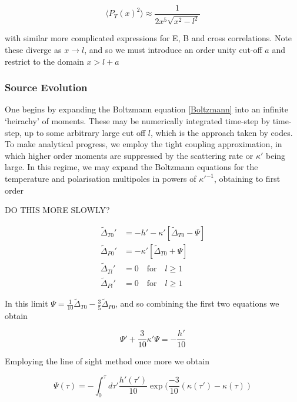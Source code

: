 \documentclass[a4paper,10pt]{article}
\begin{document}
\begin{equation}
\langle P_T(x)^2 \rangle \approx \frac{1}{2x^5\sqrt{x^2-l^2}}
\end{equation}

with similar more complicated expressions for E, B and cross correlations. Note these diverge as $x\rightarrow l$, and so we must introduce an order unity cut-off $a$ and restrict to the domain $x>l+a$





\subsubsection{Source Evolution}

One begins by expanding the Boltzmann equation \ref{Boltzmann} into an infinite `heirachy' of moments. These may be numerically integrated time-step by time-step, up to some arbitrary large cut off $l$, which is the approach taken by codes. To make analytical progress, we employ the tight coupling approximation, in which higher order moments are suppressed by the scattering rate or $\kappa'$ being large. In this regime, we may expand the Boltzmann equations for the temperature and polarisation multipoles in powers of $\kappa'^{-1}$, obtaining to first order

DO THIS MORE SLOWLY?

\begin{equation}
\begin{split}
\tilde{\Delta}_{T0}'&=-h'-\kappa'[\tilde{\Delta}_{T0}-\Psi]\\
\tilde{\Delta}_{P0}'&=-\kappa'[\tilde{\Delta}_{T0}+\Psi]\\
\tilde{\Delta}_{Tl}'&=0\quad\text{for} \quad l\geq1\\
\tilde{\Delta}_{Pl}'&=0\quad\text{for} \quad l\geq1
\end{split}
\end{equation}

In this limit $\Psi = \frac{1}{10}\tilde{\Delta}_{T0} - \frac{3}{5}\tilde{\Delta}_{P0}$, and so combining the first two equations we obtain

\begin{equation}
\Psi ' +\frac{3}{10}\kappa'\Psi = -\frac{h'}{10}
\end{equation}

Employing the line of sight method once more we obtain

\begin{equation}
\Psi(\tau) = -\int_0^\tau d\tau' \frac{h'(\tau')}{10}\exp{(\frac{-3}{10}(\kappa(\tau')-\kappa(\tau))}
\end{equation}
\end{document}
